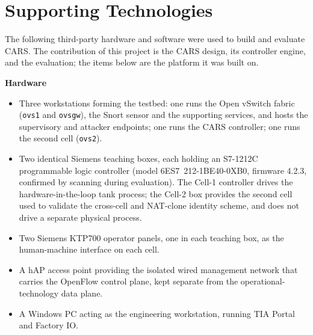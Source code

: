 \chapter*{Supporting Technologies}
\noindent
The following third-party hardware and software were used to build and evaluate CARS. The contribution of this project is the CARS design, its controller engine, and the evaluation; the items below are the platform it was built on.

\vspace{0.5em}
\noindent\textbf{Hardware}
\begin{itemize}
\item Three workstations forming the testbed: one runs the Open vSwitch fabric (\texttt{ovs1} and \texttt{ovsgw}), the Snort sensor and the supporting services, and hosts the supervisory and attacker endpoints; one runs the CARS controller; one runs the second cell (\texttt{ovs2}).
\item Two identical Siemens teaching boxes, each holding an S7-1212C programmable logic controller (model 6ES7~212-1BE40-0XB0, firmware 4.2.3, confirmed by scanning during evaluation). The Cell-1 controller drives the hardware-in-the-loop tank process; the Cell-2 box provides the second cell used to validate the cross-cell and NAT-clone identity scheme, and does not drive a separate physical process.
\item Two Siemens KTP700 operator panels, one in each teaching box, as the human-machine interface on each cell.
\item A hAP access point providing the isolated wired management network that carries the OpenFlow control plane, kept separate from the operational-technology data plane.
\item A Windows PC acting as the engineering workstation, running TIA Portal and Factory IO.
\end{itemize}

